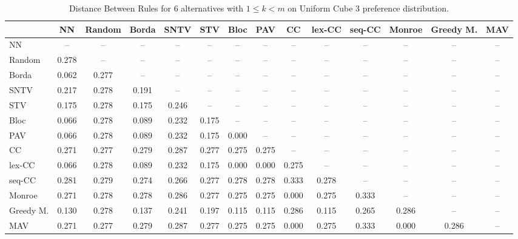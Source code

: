 
\begin{table*}
\centering
\begin{tabular}{lccccccccccccc}
\toprule
 & NN & Random & Borda & SNTV & STV & Bloc & PAV & CC & lex-CC & seq-CC & Monroe & Greedy M. & MAV \\
\midrule
NN & -- & -- & -- & -- & -- & -- & -- & -- & -- & -- & -- & -- & -- \\
Random & 0.278 & -- & -- & -- & -- & -- & -- & -- & -- & -- & -- & -- & -- \\
Borda & 0.062 & 0.277 & -- & -- & -- & -- & -- & -- & -- & -- & -- & -- & -- \\
SNTV & 0.217 & 0.278 & 0.191 & -- & -- & -- & -- & -- & -- & -- & -- & -- & -- \\
STV & 0.175 & 0.278 & 0.175 & 0.246 & -- & -- & -- & -- & -- & -- & -- & -- & -- \\
Bloc & 0.066 & 0.278 & 0.089 & 0.232 & 0.175 & -- & -- & -- & -- & -- & -- & -- & -- \\
PAV & 0.066 & 0.278 & 0.089 & 0.232 & 0.175 & 0.000 & -- & -- & -- & -- & -- & -- & -- \\
CC & 0.271 & 0.277 & 0.279 & 0.287 & 0.277 & 0.275 & 0.275 & -- & -- & -- & -- & -- & -- \\
lex-CC & 0.066 & 0.278 & 0.089 & 0.232 & 0.175 & 0.000 & 0.000 & 0.275 & -- & -- & -- & -- & -- \\
seq-CC & 0.281 & 0.279 & 0.274 & 0.266 & 0.277 & 0.278 & 0.278 & 0.333 & 0.278 & -- & -- & -- & -- \\
Monroe & 0.271 & 0.278 & 0.278 & 0.286 & 0.277 & 0.275 & 0.275 & 0.000 & 0.275 & 0.333 & -- & -- & -- \\
Greedy M. & 0.130 & 0.278 & 0.137 & 0.241 & 0.197 & 0.115 & 0.115 & 0.286 & 0.115 & 0.265 & 0.286 & -- & -- \\
MAV & 0.271 & 0.277 & 0.279 & 0.287 & 0.277 & 0.275 & 0.275 & 0.000 & 0.275 & 0.333 & 0.000 & 0.286 & -- \\
\bottomrule
\end{tabular}

\caption{Distance Between Rules for 6 alternatives with $1 \leq k < m$ on Uniform Cube 3 preference distribution.}
\end{table*}
